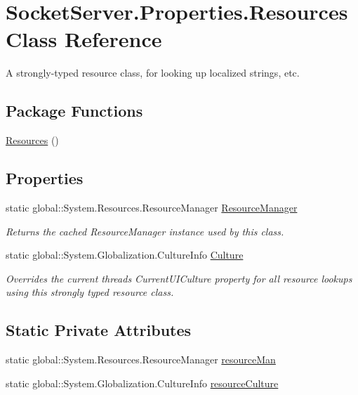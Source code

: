 \hypertarget{class_socket_server_1_1_properties_1_1_resources}{}\section{Socket\+Server.\+Properties.\+Resources Class Reference}
\label{class_socket_server_1_1_properties_1_1_resources}


A strongly-\/typed resource class, for looking up localized strings, etc.  


\subsection*{Package Functions}
\begin{DoxyCompactItemize}
\item 
\hyperlink{class_socket_server_1_1_properties_1_1_resources_a635d3737ba6641be2fa9d06b4ffac046}{Resources} ()
\end{DoxyCompactItemize}
\subsection*{Properties}
\begin{DoxyCompactItemize}
\item 
static global\+::\+System.\+Resources.\+Resource\+Manager \hyperlink{class_socket_server_1_1_properties_1_1_resources_ad33881fd19b73ba38add875b14b61a8e}{Resource\+Manager}
\begin{DoxyCompactList}\small\item\em Returns the cached Resource\+Manager instance used by this class. \end{DoxyCompactList}\item 
static global\+::\+System.\+Globalization.\+Culture\+Info \hyperlink{class_socket_server_1_1_properties_1_1_resources_aab0a7ae935ff668ce2e7b53fae50f193}{Culture}
\begin{DoxyCompactList}\small\item\em Overrides the current thread\textquotesingle{}s Current\+U\+I\+Culture property for all resource lookups using this strongly typed resource class. \end{DoxyCompactList}\end{DoxyCompactItemize}
\subsection*{Static Private Attributes}
\begin{DoxyCompactItemize}
\item 
static global\+::\+System.\+Resources.\+Resource\+Manager \hyperlink{class_socket_server_1_1_properties_1_1_resources_a51d1729829540fd2fe65a0bfaa7cc7e2}{resource\+Man}
\item 
static global\+::\+System.\+Globalization.\+Culture\+Info \hyperlink{class_socket_server_1_1_properties_1_1_resources_acc727073c26b4ca74e7fc74792b898bc}{resource\+Culture}
\end{DoxyCompactItemize}


